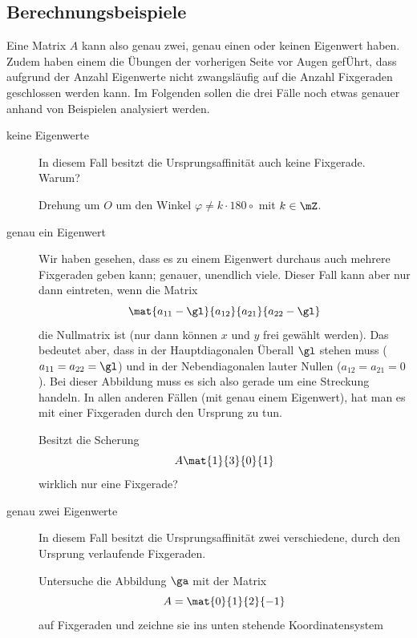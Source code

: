 \documentclass[%
11pt,%
twoside,%
titlepage,%
german,%
headsepline%
]{scrartcl}
\begin{document}
\subsection{Berechnungsbeispiele}

Eine Matrix $A$ kann also genau zwei, genau einen oder keinen Eigenwert haben. Zudem haben einem die \"Ubungen der vorherigen Seite vor Augen gef\"Uhrt, dass aufgrund der Anzahl Eigenwerte nicht zwangsläufig auf die Anzahl Fixgeraden geschlossen werden kann. Im Folgenden sollen die drei Fälle noch etwas genauer anhand von Beispielen analysiert werden.

\begin{description}
\item[keine Eigenwerte] In diesem Fall besitzt die Ursprungsaffinität auch keine Fixgerade. Warum?
\begin{bsp}
Drehung um $O$ um den Winkel $\varphi\neq k\cdot180\circ$ mit $k\in\mZ$.
\end{bsp}
\item[genau ein Eigenwert] Wir haben gesehen, dass es zu einem Eigenwert durchaus auch mehrere Fixgeraden geben kann; genauer, unendlich viele. Dieser Fall kann aber nur dann eintreten, wenn die Matrix
$$\mat{a_{11}-\gl}{a_{12}}{a_{21}}{a_{22}-\gl}$$
die Nullmatrix ist (nur dann können $x$ und $y$ frei gewählt werden). Das bedeutet aber, dass in der Hauptdiagonalen \"Uberall $\gl$ stehen muss ($a_{11}=a_{22}=\gl$) und in der Nebendiagonalen lauter Nullen ($a_{12}=a_{21}=0$). Bei dieser Abbildung muss es sich also gerade um eine Streckung handeln.
In allen anderen Fällen (mit genau einem Eigenwert), hat man es mit einer Fixgeraden durch den Ursprung zu tun.
\begin{bsp}
Besitzt die Scherung
$$A\mat{1}{3}{0}{1}$$
wirklich nur eine Fixgerade?
\end{bsp}
\item[genau zwei Eigenwerte] In diesem Fall besitzt die Ursprungsaffinität zwei verschiedene, durch den Ursprung verlaufende Fixgeraden.
\begin{bsp}
Untersuche die Abbildung $\ga$ mit der Matrix
$$A=\mat{0}{1}{2}{-1}$$
auf Fixgeraden und zeichne sie ins unten stehende Koordinatensystem
\begin{center}
\end{center}
\end{bsp}


\end{description}
\end{document}
